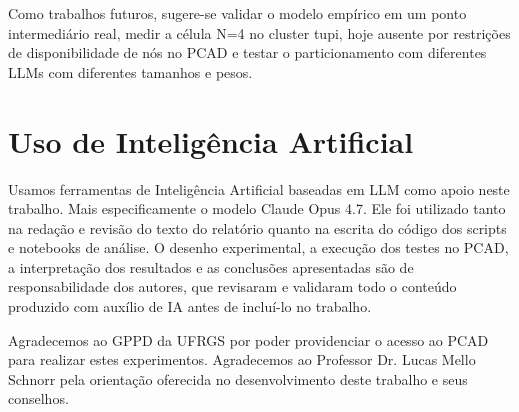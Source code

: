 \documentclass[manuscript,screen]{acmart}
\begin{document}
Como trabalhos futuros, sugere-se validar o modelo empírico em um ponto intermediário real, medir a célula N=4 no cluster tupi, hoje ausente por restrições de disponibilidade de nós no PCAD e testar o particionamento com diferentes LLMs com diferentes tamanhos e pesos.

\section{Uso de Inteligência Artificial}

Usamos ferramentas de Inteligência Artificial baseadas em LLM como apoio neste trabalho. Mais especificamente o modelo Claude Opus 4.7. Ele foi utilizado tanto na redação e revisão do texto do relatório quanto na escrita do código dos scripts e notebooks de análise. O desenho experimental, a execução dos testes no PCAD, a interpretação dos resultados e as conclusões apresentadas são de responsabilidade dos autores, que revisaram e validaram todo o conteúdo produzido com auxílio de IA antes de incluí-lo no trabalho.

\begin{acks}
Agradecemos ao GPPD da UFRGS por poder providenciar o acesso ao PCAD para realizar estes experimentos.
Agradecemos ao Professor Dr. Lucas Mello Schnorr pela orientação oferecida no desenvolvimento deste trabalho e seus conselhos.
\end{acks}



\end{document}
